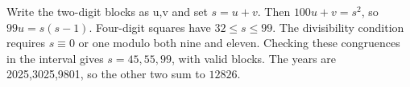 Write the two-digit blocks as u,v and set $s=u+v$. Then $100u+v=s^2$, so $99u=s(s-1)$. Four-digit squares have $32\le s\le99$. The divisibility condition requires $s\equiv0$ or one modulo both nine and eleven. Checking these congruences in the interval gives $s=45,55,99$, with valid blocks. The years are 2025,3025,9801, so the other two sum to $\boxed{12826}$.
